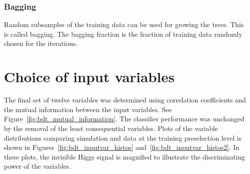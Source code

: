 \subsubsection{Bagging}
Random subsamples of the training data can be used for growing the trees. This is called bagging.
The bagging fraction is the fraction of training data randomly chosen for the iterations.

\section{Choice of input variables}

The final set of twelve variables was determined using correlation coefficients and the mutual information between the input variables.
See Figure~\ref{fig:bdt_mutual_information}.
The classifier performance was unchanged by the removal of the least consequential variables.
Plots of the variable distributions comparing simulation and data at the training preselection level is shown in Figures~\ref{fig:bdt_inputvar_histos} and~\ref{fig:bdt_inputvar_histos2}.
In these plots, the invisible Higgs signal is magnified to illustrate the discriminating power of the variables.

